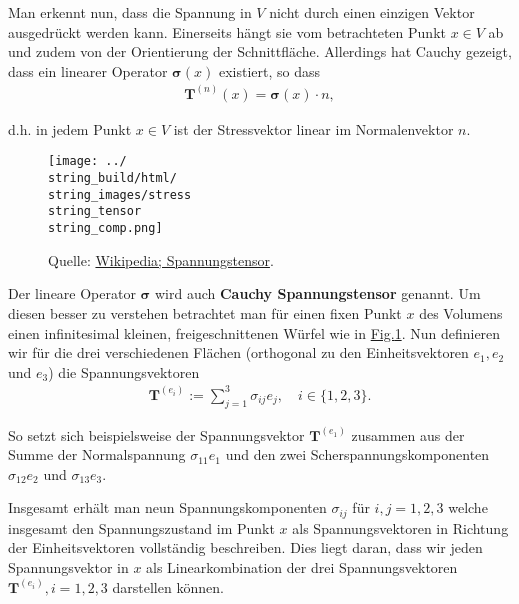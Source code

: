 \documentclass[letterpaper,10pt,english]{jupyterBook}
\begin{document}
\par
Man erkennt nun, dass die Spannung in \(V\) nicht durch einen einzigen Vektor ausgedrückt werden kann. Einerseits hängt sie vom betrachteten Punkt \(x\in V\) ab und zudem von der Orientierung der Schnittfläche. Allerdings hat Cauchy gezeigt, dass ein linearer Operator \(\mathbf{\sigma}(x)\) existiert, so dass
\begin{align*}
\mathbf{T}^{(n)}(x) = \mathbf{\sigma}(x) \cdot n,
\end{align*}
\par
d.h. in jedem Punkt \(x\in V\) ist der Stressvektor linear im Normalenvektor \(n\).

\begin{figure}[htbp]
\centering


\noindent\texttt{[image: ../\\string\_build/html/\\string\_images/stress\\string\_tensor\\string\_comp.png]}
\caption{Quelle: \href{https://de.wikipedia.org/wiki/Spannungstensor}{Wikipedia; Spannungstensor}.}\label{\detokenize{vektoranalysis/tensor:fig-stress-comp}}\end{figure}

\par
Der lineare Operator \(\mathbf{\sigma}\) wird auch \textbf{Cauchy Spannungstensor} genannt.
Um diesen besser zu verstehen betrachtet man für einen fixen Punkt \(x\) des Volumens einen infinitesimal kleinen, freigeschnittenen Würfel wie in \hyperref[\detokenize{vektoranalysis/tensor:fig-stress-comp}]{Fig.\@ \ref{\detokenize{vektoranalysis/tensor:fig-stress-comp}}}.
Nun definieren wir für die drei verschiedenen Flächen (orthogonal zu den Einheitsvektoren \(e_1, e_2\) und \(e_3\)) die Spannungsvektoren
\begin{align*}
\mathbf{T}^{(e_i)}:= \sum_{j=1}^3 \sigma_{ij} e_j, \quad i \in \lbrace 1,2,3 \rbrace.
\end{align*}
\par
So setzt sich beispielsweise der Spannungsvektor \(\mathbf{T}^{(e_1)}\) zusammen aus der Summe der Normalspannung \(\sigma_{11} e_1\) und den zwei Scherspannungskomponenten \(\sigma_{12} e_2\) und \(\sigma_{13} e_3\).

\par
Insgesamt erhält man neun Spannungskomponenten \(\sigma_{ij}\) für \(i,j=1,2,3\) welche insgesamt den Spannungszustand im Punkt \(x\) als Spannungsvektoren in Richtung der Einheitsvektoren vollständig beschreiben.
Dies liegt daran, dass wir jeden Spannungsvektor in \(x\) als Linearkombination der drei Spannungsvektoren \(\mathbf{T}^{(e_i)}, i=1,2,3\) darstellen können.
\end{document}
